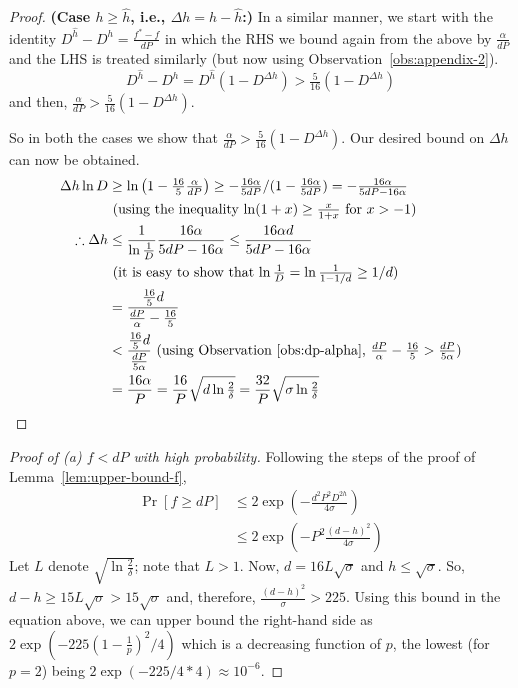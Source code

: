 \begin{proof}
    {\bf (Case $h \ge \hat{h}$, i.e., $\Delta h = h - \hat{h}$:)} In a similar
    manner, we start with the identity $D^{\hat{h}} - D^h = \tfrac{f^* -
    f}{dP}$ in which the RHS we bound again from the above by
    $\tfrac{\alpha}{dP}$ and the LHS is treated similarly (but now using
    Observation~\ref{obs:appendix-2}).
    $$D^{\hat{h}} - D^h = D^{\hat{h}}(1-D^{\Delta h}) > \tfrac{5}{16}
    (1-D^{\Delta h})$$ and then, $\tfrac{\alpha}{dP} >
    \tfrac{5}{16}(1-D^{\Delta h})$.

    So in both the cases we show that $\tfrac{\alpha}{dP} >
    \tfrac{5}{16}(1-D^{\Delta h})$. Our desired bound on $\Delta h$ can now be
    obtained.
    \begin{align*}
	\Delta h \ln D & \ge \ln\left( 1 - \tfrac{16}{5}\tfrac{\alpha}{dP} \right)
			 \ge -\tfrac{16\alpha}{5dP}/(1-\tfrac{16\alpha}{5dP}) =
	-\tfrac{16\alpha}{5dP-16\alpha}\\
	& \mbox{ (using the inequality $\ln(1+x) \ge
	\tfrac{x}{1+x}$ for $x > -1$)} \\
	\therefore \Delta h & \le \frac{1}{\ln\tfrac{1}{D}} \frac{16\alpha}{5dP -
	16\alpha} \le \frac{16\alpha d}{5dP - 16\alpha}\\
	& \mbox{ (it is easy to show that $\ln \tfrac{1}{D} =
	\ln\tfrac{1}{1-1/d} \ge 1/d$)}\\
	& = \frac{\tfrac{16}{5}d}{\tfrac{dP}{\alpha} - \tfrac{16}{5}} \\
	& < \frac{\tfrac{16}{5}d}{\tfrac{dP}{5\alpha}} 
	\mbox{ (using Observation~\ref{obs:dp-alpha}, $\tfrac{dP}{\alpha}-\tfrac{16}{5} >\tfrac{dP}{5\alpha}$)}\\
	& = \frac{16\alpha}{P} = \frac{16}{P}\sqrt{d \ln \tfrac{2}{\delta}} =
	\frac{32}{P}\sqrt{\sigma \ln \tfrac{2}{\delta}}
    \end{align*}
\end{proof}


\hconcentrationlemmatight*

\begin{proof}[Proof of (a) $f < dP$ with high probability]
    Following the steps of the proof of Lemma~\ref{lem:upper-bound-f},
    \begin{align*}
	\Pr[f \ge dP] & \le 2\exp(-\tfrac{d^2 P^2 D^{2h}}{4\sigma}) \\
		      & \le 2\exp(-P^2\tfrac{(d-h)^2}{4\sigma})
    \end{align*}
    Let $L$ denote $\sqrt{\ln\tfrac{2}{\delta}}$; note that $L > 1$. Now, $d=16L\sqrt{\sigma}$ and $h \le \sqrt{\sigma}$. So, $d-h \ge 15L\sqrt{\sigma} > 15\sqrt{\sigma}$ and, therefore, $\tfrac{(d-h)^2}{\sigma} > 225$. Using this bound in the equation above, we can upper bound the right-hand side as $2\exp(-225(1-\tfrac{1}{p})^2/4)$ which is a decreasing function of $p$, the lowest (for $p=2$) being $2\exp(-225/4*4) \approx 10^{-6}$.
\end{proof}

